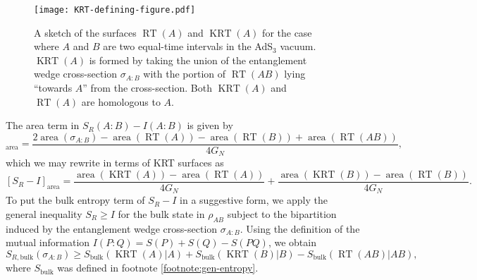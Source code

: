 \documentclass[a4paper,11pt]{article}
\newcommand{\area}{\operatorname{area}}
\newcommand{\RT}{\operatorname{RT}}
\newcommand{\KRT}{\operatorname{KRT}}
\begin{document}
\begin{figure}
    \centering
    \texttt{[image: KRT-defining-figure.pdf]}
    \caption{A sketch of the surfaces $\RT(A)$ and $\KRT(A)$ for the case where $A$ and $B$ are two equal-time intervals in the AdS$_3$ vacuum. $\KRT(A)$ is formed by taking the union of the entanglement wedge cross-section $\sigma_{A:B}$ with the portion of $\RT(AB)$ lying ``towards $A$'' from the cross-section. Both $\KRT(A)$ and $\RT(A)$ are homologous to $A$.}
    \label{fig:KRT-defining-figure}
\end{figure}

The area term in $S_R(A:B) - I(A:B)$ is given by
\begin{equation}
    [S_R - I]_{\area}
        = \frac{2 \area(\sigma_{A:B}) - \area(\RT(A)) - \area(\RT(B)) + \area(\RT(AB))}{4 G_N},
\end{equation}
which we may rewrite in terms of KRT surfaces as
\begin{equation} \label{eq:SRmI-area}
    [S_R - I]_{\area}
        = \frac{\area(\KRT(A)) - \area(\RT(A))}{4 G_N} + \frac{\area(\KRT(B)) - \area(\RT(B))}{4 G_N}.
\end{equation}
To put the bulk entropy term of $S_R - I$ in a suggestive form, we apply the general inequality $S_R \geq I$ for the bulk state in $\rho_{AB}$ subject to the bipartition induced by the entanglement wedge cross-section $\sigma_{A:B}.$ Using the definition of the mutual information $I(P:Q)=S(P)+S(Q)-S(PQ)$, we obtain
\begin{equation} \label{eq:SRmI-bulk}
    S_{R, \text{bulk}}(\sigma_{A:B}) \geq S_{\text{bulk}}(\KRT(A)|A) + S_{\text{bulk}}(\KRT(B)|B) - S_{\text{bulk}}(\RT(AB)|AB),
\end{equation}
where $S_{\text{bulk}}$ was defined in footnote \ref{footnote:gen-entropy}.
\end{document}
